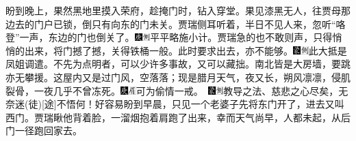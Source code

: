 盼到晚上，果然黑地里摸入荣府，趁掩门时，钻入穿堂。果见漆黑无人，往贾母那边去的门户已锁，倒只有向东的门未关。贾瑞侧耳听着，半日不见人来，忽听``咯登''一声，东边的门也倒关了。{\includegraphics[width=3mm]{../Images/00004}\includegraphics[width=3mm]{../Images/00011}\footnotesize \kaishu 平平略施小计。}贾瑞急的也不敢则声，只得悄悄的出来，将门撼了撼，关得铁桶一般。此时要求出去，亦不能够。{\includegraphics[width=3mm]{../Images/00006}\includegraphics[width=3mm]{../Images/00011}\footnotesize \kaishu 此大抵是凤姐调遣。不先为点明者，可以少许多事故，又可以藏拙。}南北皆是大房墙，要跳亦无攀援。这屋内又是过门风，空落落；现是腊月天气，夜又长，朔风凛凛，侵肌裂骨，一夜几乎不曾冻死。{{\includegraphics[width=3mm]{../Images/00004}\includegraphics[width=3mm]{../Images/00010}\footnotesize \kaishu 可为偷情一戒。　}\includegraphics[width=3mm]{../Images/00006}\includegraphics[width=3mm]{../Images/00011}\footnotesize \kaishu 教导之法、慈悲之心尽矣，无奈迷{(徒)}{[}途{]}不悟何！}好容易盼到早晨，只见一个老婆子先将东门开了，进去又叫西门。贾瑞瞅他背着脸，一溜烟抱着肩跑了出来，幸而天气尚早，人都未起，从后门一径跑回家去。


